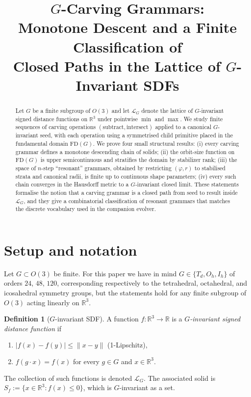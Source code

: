 \documentclass[11pt]{article}
\title{$G$-Carving Grammars:\\
Monotone Descent and a Finite Classification of\\
Closed Paths in the Lattice of $G$-Invariant SDFs}
\author{}
\date{}
\theoremstyle{definition}
\newtheorem{definition}[theorem]{Definition}
\begin{document}
\maketitle

\begin{abstract}
Let $G$ be a finite subgroup of $O(3)$ and let $\mathcal{L}_G$ denote the
lattice of $G$-invariant signed distance functions on $\mathbb{R}^3$ under
pointwise $\min$ and $\max$. We study finite sequences of carving operations
$(\text{subtract}, \text{intersect})$ applied to a canonical $G$-invariant
seed, with each operation using a symmetrised child primitive placed in the
fundamental domain $\mathrm{FD}(G)$. We prove four small structural results:
(i) every carving grammar defines a monotone descending chain of solids;
(ii) the orbit-size function on $\mathrm{FD}(G)$ is upper semicontinuous and
stratifies the domain by stabilizer rank; (iii) the space of $n$-step
``resonant'' grammars, obtained by restricting $(\varphi, r)$ to
stabilised strata and canonical radii, is finite up to continuous shape
parameters; (iv) every such chain converges in the Hausdorff metric to a
$G$-invariant closed limit. These statements formalise the notion that a
carving grammar is a closed path from seed to result inside $\mathcal{L}_G$,
and they give a combinatorial classification of resonant grammars that
matches the discrete vocabulary used in the companion evolver.
\end{abstract}

\section{Setup and notation}
\label{sec:setup}

Let $G \subset O(3)$ be finite. For this paper we have in mind
$G \in \{T_d, O_h, I_h\}$ of orders $24$, $48$, $120$, corresponding
respectively to the tetrahedral, octahedral, and icosahedral symmetry
groups, but the statements hold for any finite subgroup of $O(3)$
acting linearly on $\mathbb{R}^3$.

\begin{definition}[$G$-invariant SDF]
A function $f : \mathbb{R}^3 \to \mathbb{R}$ is a \emph{$G$-invariant signed
distance function} if
\begin{enumerate}
\item $|f(x) - f(y)| \le \|x-y\|$ (1-Lipschitz),
\item $f(g\cdot x) = f(x)$ for every $g \in G$ and $x \in \mathbb{R}^3$.
\end{enumerate}
The collection of such functions is denoted $\mathcal{L}_G$. The
associated solid is $S_f := \{x \in \mathbb{R}^3 : f(x) \le 0\}$, which
is $G$-invariant as a set.
\end{definition}
\end{document}

